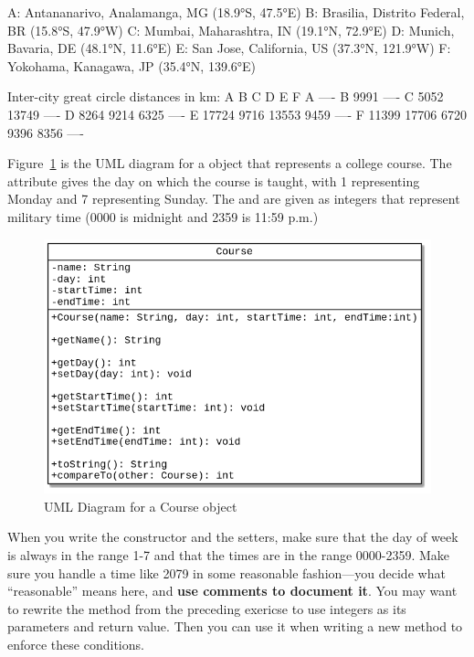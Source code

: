 \begin{exercise}
\begin{stdout}
A: Antananarivo, Analamanga, MG (18.9°S, 47.5°E)
B: Brasilia, Distrito Federal, BR (15.8°S, 47.9°W)
C: Mumbai, Maharashtra, IN (19.1°N, 72.9°E)
D: Munich, Bavaria, DE (48.1°N, 11.6°E)
E: San Jose, California, US (37.3°N, 121.9°W)
F: Yokohama, Kanagawa, JP (35.4°N, 139.6°E)

Inter-city great circle distances in km:
        A       B       C       D       E       F    
A      ----
B      9991    ----
C      5052   13749    ----
D      8264    9214    6325    ----
E     17724    9716   13553    9459    ----
F     11399   17706    6720    9396    8356    ---- 
\end{stdout}

\end{exercise}

\begin{exercise}
Figure~\ref{fig.courseuml} is the UML diagram for a  object that represents a college course. The  attribute gives the day on which the course is taught, with 1 representing Monday and 7 representing Sunday. The  and  are given as integers that represent military time (0000 is midnight and 2359 is 11:59 p.m.)

\begin{figure}[!h]
\begin{center}
\includegraphics[scale=0.5]{figs/ch12/course.png}
\caption{UML Diagram for a Course object}
\label{fig.courseuml}
\end{center}
\end{figure}

When you write the constructor and the setters, make sure that the day of week is always in the range 1-7 and that the times are in the range 0000-2359. Make sure you handle a time like 2079 in some reasonable fashion---you decide what ``reasonable'' means here, and {\bf use comments to document it}. You may want to rewrite the  method from the preceding exericse to use integers as its parameters and return value. Then you can use it when writing a new  method to enforce these conditions.


\end{exercise}
